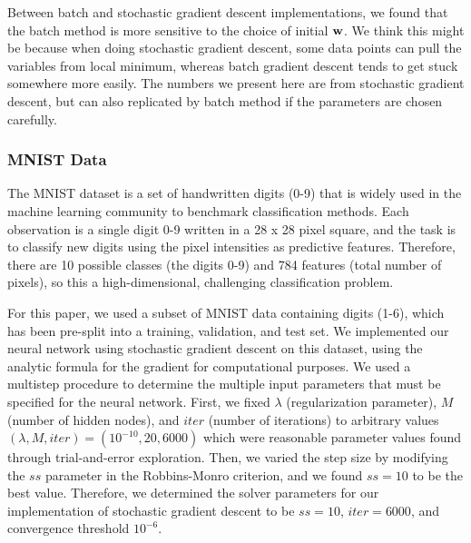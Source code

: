 Between batch and stochastic gradient descent implementations, we found that the batch method is more sensitive to the choice of initial $\boldsymbol{\mathbf{w}}$. We think this might be because when doing stochastic gradient descent, some data points can pull the variables from local minimum, whereas batch gradient descent tends to get stuck somewhere more easily. The numbers we present here are from stochastic gradient descent, but can also replicated by batch method if the parameters are chosen carefully.


\subsubsection{MNIST Data}

The MNIST dataset is a set of handwritten digits (0-9) that is widely used in the machine learning community to benchmark classification methods.  Each observation is a single digit 0-9 written in a 28 x 28 pixel square, and the task is to classify new digits using the pixel intensities as predictive features.  Therefore, there are 10 possible classes (the digits 0-9) and 784 features (total number of pixels), so this a high-dimensional, challenging classification problem.  

For this paper, we used a subset of MNIST data containing digits (1-6), which has been pre-split into a training, validation, and test set.  We implemented our neural network using stochastic gradient descent on this dataset, using the analytic formula for the gradient for computational purposes. We used a multistep procedure to determine the multiple input parameters that must be specified for the neural network.  First, we fixed $\lambda$ (regularization parameter),  $M$ (number of hidden nodes), and $iter$ (number of iterations) to arbitrary values $(\lambda, M, iter) = (10^{-10}, 20, 6000)$ which were reasonable parameter values found through trial-and-error exploration.  Then, we varied the step size by modifying the $ss$ parameter in the Robbins-Monro criterion, and we found $ss = 10$ to be the best value.  Therefore, we determined the solver parameters for our implementation of stochastic gradient descent to be $ss = 10$, $iter = 6000$, and convergence threshold $10^{-6}$.  


